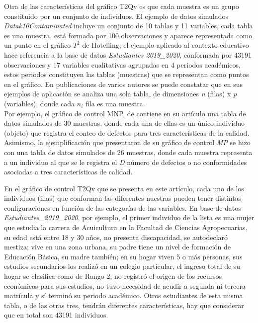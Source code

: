 \documentclass[water,article,submit,moreauthors,pdftex]{mdpi}
\begin{document}
Otra de las características del gráfico T2Qv es que cada muestra es un
grupo constituido por un conjunto de individuos. El ejemplo de datos
simulados \emph{Datak10Contaminated} incluye un conjunto de 10 tablas y
11 variables, cada tabla es una muestra, está formada por 100
observaciones y aparece representada como un punto en el gráfico \(T^2\)
de Hotelling; el ejemplo aplicado al contexto educativo hace referencia
a la base de datos \emph{Estudiantes 2019\_2020}, conformada por 43191
observaciones y 17 variables cualitativas agrupadas en 4 periodos
académicos, estos periodos constituyen las tablas (muestras) que se
representan como puntos en el gráfico. En publicaciones de varios
autores se puede constatar que en sus ejemplos de aplicación se analiza
una sola tabla, de dimensiones \emph{n} (filas) x \emph{p} (variables),
donde cada \(n_i\) fila es una muestra.\\
Por ejemplo, el gráfico de control MNP, de \citet{lu1998control}
contiene en su artículo una tabla de datos simulados de 30 muestras,
donde cada una de ellas es un único individuo (objeto) que registra el
conteo de defectos para tres características de la calidad. Asimismo, la
ejemplificación que \citet{chiu2007} presentaron de su gráfico de
control \emph{MP} se hizo con una tabla de datos simulados de 26
muestras, donde cada muestra representa a un individuo al que se le
registra el \emph{D} número de defectos o no conformidades asociadas a
tres características de calidad.

En el gráfico de control T2Qv que se presenta en este artículo, cada uno
de los individuos (filas) que conforman las diferentes nuestras pueden
tener distintas configuraciones en función de las categorías de las
variables. En base de datos \emph{Estudiantes\_2019\_2020}, por ejemplo,
el primer individuo de la lista es una mujer que estudia la carrera de
Acuicultura en la Facultad de Ciencias Agropecuarias, su edad está entre
18 y 30 años, no presenta discapacidad, se autodeclaró mestiza; vive en
una zona urbana, su padre tiene un nivel de formación de Educación
Básica, su madre también; en su hogar viven 5 o más personas, sus
estudios secundarios los realizó en un colegio particular, el ingreso
total de su hogar se clasifica como de Rango 2, no registró el origen de
los recursos económicos para sus estudios, no tuvo necesidad de acudir a
segunda ni tercera matrícula y sí terminó su periodo académico. Otros
estudiantes de esta misma tabla, o de las otras tres, tendrán diferentes
características, hay que considerar que en total son 43191 individuos.
\end{document}
